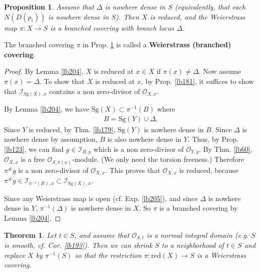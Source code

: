 \documentclass[12pt,b5paper,notitlepage]{report}
\theoremstyle{definition}
\theoremstyle{plain}
\newtheorem{thm}[df]{Theorem}
\newtheorem{pp}[df]{Proposition}
\newcommand{\scr}{\mathscr}
\newcommand{\red}{\mathrm{red}}
\newcommand{\Sg}{\mathrm{Sg}}
\numberwithin{equation}{section}
\begin{document}
\begin{pp}\label{lb206}
Assume that $\Delta$ is nowhere dense in $S$ (equivalently, that each $N(D(p_i))$ is nowhere dense in $S$). Then $X$ is reduced, and the Weierstrass map $\pi:X\rightarrow S$ is a branched covering with branch locus $\Delta$.
\end{pp}

The branched covering $\pi$ in Prop. \ref{lb206} is called a \textbf{Weierstrass (branched) covering}.  

\begin{proof}
By Lemma \ref{lb204}, $X$ is reduced at $x\in X$ if $\pi(x)\neq\Delta$. Now assume $\pi(x)=\Delta$. To show that $X$ is reduced at $x$, by Prop. \ref{lb181}, it suffices to show that $\scr I_{\Sg(X),x}$ contains a non zero-divisor of $\scr O_{X,x}$.

By Lemma \ref{lb204}, we have $\Sg(X)\subset \pi^{-1}(B)$ where
\begin{align*}
B=\Sg(Y)\cup\Delta.
\end{align*}
Since $Y$ is reduced, by Thm. \ref{lb179}, $\Sg(Y)$ is nowhere dense in $B$. Since $\Delta$ is nowhere dense by assumption, $B$ is also nowhere dense in $Y$. Thus, by Prop. \ref{lb123}, we can find $g\in\scr I_{B,y}$ which is a non zero-divisor of $\scr O_{Y,y}$. By Thm. \ref{lb60}, $\scr O_{X,x}$ is a free $\scr O_{S,\pi(x)}$-module. (We only need the torsion freeness.) Therefore $\pi^\# g$ is a non zero-divisor of $\scr O_{X,x}$. This proves that $\scr O_{X,x}$ is reduced, because $\pi^\#g\in\scr I_{\pi^{-1}(B),x}\subset\scr I_{\Sg(X),x}$. 

Since any Weierstrass map is open (cf. Exp. \ref{lb205}), and since $\Delta$ is nowhere dense in $Y$, $\pi^{-1}(\Delta)$ is nowhere dense in $X$. So $\pi$ is a branched covering by Lemma \ref{lb204}.
\end{proof}







\begin{thm}\label{lb210}
Let $t\in S$, and assume that $\scr O_{S,t}$ is a normal integral domain (e.g. $S$ is smooth, cf. Cor. \ref{lb193}). Then we can shrink $S$ to a neighborhood of $t\in S$ and replace $X$ by $\pi^{-1}(S)$ so that the restriction $\pi:\red(X)\rightarrow S$ is a Weierstrass covering.
\end{thm}
\end{document}
